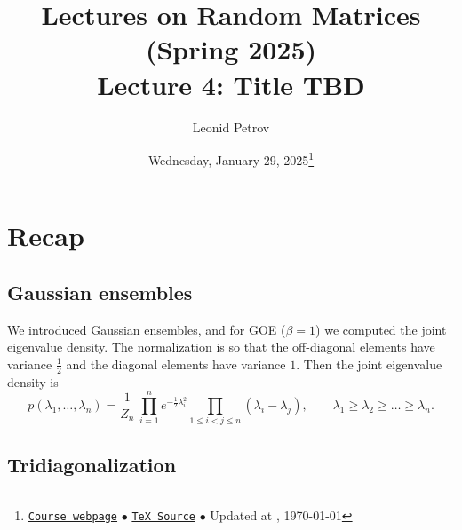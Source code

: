 \documentclass[letterpaper,11pt,oneside,reqno]{article}
\numberwithin{equation}{section}
\theoremstyle{definition}
\begin{document}
\title{Lectures on Random Matrices
(Spring 2025)
\\Lecture 4: Title TBD}


\date{Wednesday, January 29, 2025\footnote{\href{https://lpetrov.cc/rmt25/}{\texttt{Course webpage}}
$\bullet$ \href{https://lpetrov.cc/rmt25/rmt25-notes/rmt2025-l04.tex}{\texttt{TeX Source}}
$\bullet$
Updated at \currenttime, \today}}



\author{Leonid Petrov}


\maketitle
\tableofcontents

\section{Recap}

\subsection{Gaussian ensembles}

We introduced Gaussian ensembles,
and for GOE ($\beta=1$) we computed the joint eigenvalue density.
The normalization is so that the off-diagonal elements have variance $\frac{1}{2}$
and the diagonal elements have variance $1$.
Then the joint eigenvalue density is
\begin{equation*}
	p(\lambda_1,\ldots,\lambda_n)
	=
	\frac{1}{Z_n}\,
	\prod_{i=1}^n e^{-\frac{1}{2}\lambda_i^2}
	\prod_{1\le i<j\le n}(\lambda_i - \lambda_j),
	\qquad
	\lambda_1\ge \lambda_2\ge \ldots \ge \lambda_n.
\end{equation*}

\subsection{Tridiagonalization}
\end{document}
